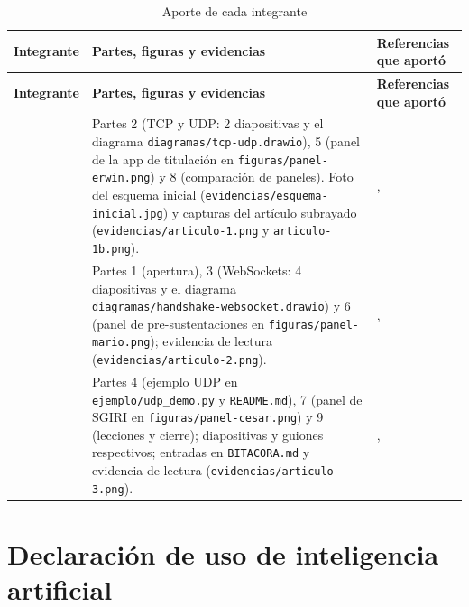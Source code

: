 \documentclass[11pt,a4paper]{article}
\begin{document}
{\small\renewcommand{\arraystretch}{1.2}
\begin{xltabular}{\textwidth}{@{}>{\raggedright\arraybackslash}p{4.8cm}X>{\raggedright\arraybackslash}p{4.4cm}@{}}
  \caption{Aporte de cada integrante}\label{tab:aportes}\\
  \toprule
  \textbf{Integrante} & \textbf{Partes, figuras y evidencias} & \textbf{Referencias que aportó}\\
  \midrule
  \endfirsthead
  \toprule
  \textbf{Integrante} & \textbf{Partes, figuras y evidencias} & \textbf{Referencias que aportó}\\
  \midrule
  \endhead
  \bottomrule
  \endlastfoot
   & Partes 2 (TCP y UDP: 2 diapositivas y el diagrama \texttt{diagramas/tcp-udp.drawio}), 5 (panel de la app de titulación en \texttt{figuras/panel-erwin.png}) y 8 (comparación de paneles). Foto del esquema inicial (\texttt{evidencias/esquema-inicial.jpg}) y capturas del artículo subrayado (\texttt{evidencias/articulo-1.png} y \texttt{articulo-1b.png}). & \cite{barghash2022}, \cite{lasocha2021}\\
   & Partes 1 (apertura), 3 (WebSockets: 4 diapositivas y el diagrama \texttt{diagramas/handshake-websocket.drawio}) y 6 (panel de pre-sustentaciones en \texttt{figuras/panel-mario.png}); evidencia de lectura (\texttt{evidencias/articulo-2.png}). & \cite{Murley2021}, \cite{Mitrovic2023}\\
   & Partes 4 (ejemplo UDP en \texttt{ejemplo/udp\_demo.py} y \texttt{README.md}), 7 (panel de SGIRI en \texttt{figuras/panel-cesar.png}) y 9 (lecciones y cierre); diapositivas y guiones respectivos; entradas en \texttt{BITACORA.md} y evidencia de lectura (\texttt{evidencias/articulo-3.png}). & \cite{eddy2022rfc9293}, \cite{hamilton2022rfc9220}\\
\end{xltabular}}

\section{Declaración de uso de inteligencia artificial}
\end{document}
